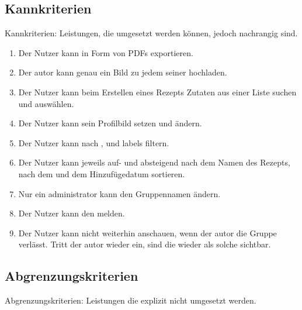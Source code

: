 \documentclass[parskip=full]{scrartcl}
\begin{document}
\subsection{Kannkriterien}
Kannkriterien: Leistungen, die umgesetzt werden können, jedoch nachrangig sind.

\begin{enumerate}[start=1,label={$\langle$\bfseries RC\arabic*$\rangle$}, leftmargin = 5em, itemsep=4pt, parsep=4pt]
    \item Der Nutzer kann  in Form von PDFs exportieren.\label{rc:PDFExport}
    \item Der \gls{autor} kann genau ein Bild zu jedem seiner  hochladen.\label{rc:Images}
    \item Der Nutzer kann beim Erstellen eines Rezepts Zutaten aus einer Liste suchen und auswählen.\label{rc:IngredientList}
    \item Der Nutzer kann sein Profilbild setzen und ändern.\label{rc:ProfileImage}
    \item Der Nutzer kann  nach ,  und \gls{labels} filtern.\label{rc:Filtering}
    \item Der Nutzer kann  jeweils auf- und absteigend nach dem Namen des Rezepts, nach dem  und dem Hinzufügedatum sortieren.\label{rc:Sorting}
    \item Nur ein \gls{administrator} kann den Gruppennamen ändern.\label{rc:GroupRenaming}
    \item Der Nutzer kann den   melden.\label{rc:RecipeMelden}
    \item Der Nutzer kann   nicht weiterhin anschauen, wenn der \gls{autor} die Gruppe verlässt. Tritt der \gls{autor} wieder ein, sind die   wieder als solche sichtbar.\label{rc:FavoriteAuthorRejoin}

\end{enumerate}

\subsection{Abgrenzungskriterien}
Abgrenzungskriterien: Leistungen die explizit nicht umgesetzt werden.
\end{document}
